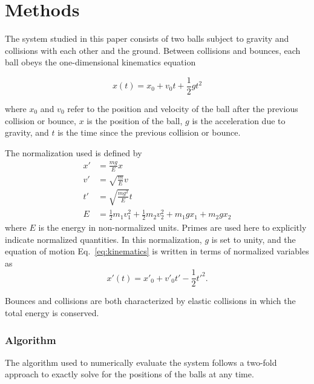 \documentclass[pra,twocolumn,showpacs,amsmath,amssymb, aps, 10pt]{revtex4-1}
\begin{document}

\section{Methods} \label{sec:methods}

The system studied in this paper consists of two balls subject to gravity and
collisions with each other and the ground. Between collisions and bounces, each
ball obeys the one-dimensional kinematics equation

\begin{equation}
  x(t) = x_0 + v_0 t + \frac{1}{2} g t^2
  \label{eq:kinematics}
\end{equation}

where $x_0$ and $v_0$ refer to the position and velocity
of the ball after the previous collision or bounce, $x$ is the position of the ball,
$g$ is the acceleration due to gravity, and $t$ is the time since the previous
collision or bounce. %

The normalization used is defined by
\begin{align}
x' &= \frac{mg}{E} x \\
v' &= \sqrt{\frac{m}{E}} v \\
t' &= \sqrt{\frac{mg^2}{E}} t \\
E &= \frac{1}{2} m_1 v_1^2 + \frac{1}{2} m_2 v_2^2 + m_1 g x_1 + m_2 g x_2
\label{eq:normalization}
\end{align}
where $E$ is the energy in non-normalized units.
Primes are used here to explicitly indicate normalized quantities.
In this normalization, $g$ is set to unity, and the equation of motion
Eq.~\ref{eq:kinematics} is written in terms of normalized variables as
\begin{equation}
x'(t) = x'_0 + v'_0 t' - \frac{1}{2} t'^2.
\label{eq:kinematics_normalized}
\end{equation}

Bounces and collisions are both characterized by elastic collisions in which
the total energy is conserved.

\subsubsection{Algorithm}

The algorithm used to numerically evaluate the system follows a two-fold approach
to exactly solve for the positions of the balls at any time.
\end{document}
